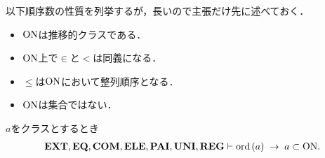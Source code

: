 	以下順序数の性質を列挙するが，長いので主張だけ先に述べておく．
	\begin{itemize}
		\item $\mathrm{ON}$は推移的クラスである．
		\item $\mathrm{ON}$上で$\in$と$<$は同義になる．
		\item $\leq$は$\mathrm{ON}$において整列順序となる．
		\item $\mathrm{ON}$は集合ではない．
	\end{itemize}
	
	\begin{screen}
		\begin{thm}
		\label{thm:transitive_totally_ordered_class}
			$a$をクラスとするとき
			\begin{align}
				\mbox{{\bf EXT}},\mbox{{\bf EQ}},\mbox{\bf COM},\mbox{{\bf ELE}},\mbox{{\bf PAI}},\mbox{{\bf UNI}},\mbox{{\bf REG}} \vdash 
				\operatorname*{ord}\hspace{0.15em}(a) \hspace{0.25em}\rightarrow\hspace{0.25em} a \subset \mathrm{ON}.
			\end{align}
		\end{thm}
	\end{screen}
	
